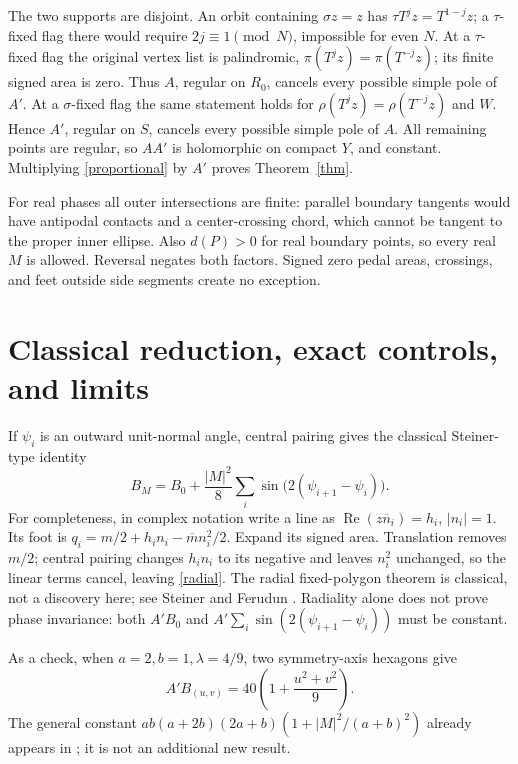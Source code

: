 \documentclass[11pt]{article}
\newcommand{\pp}{\pi}
\begin{document}
The two supports are disjoint. An orbit containing \(\sigma z=z\)
has \(\tau T^jz=T^{1-j}z\); a \(\tau\)-fixed flag there would require
\(2j\equiv1\pmod N\), impossible for even \(N\).
At a \(\tau\)-fixed flag the original vertex list is palindromic,
\(\pp(T^jz)=\pp(T^{-j}z)\); its finite signed area is zero.
Thus \(A\), regular on \(R_0\), cancels every possible simple pole of \(A'\).
At a \(\sigma\)-fixed flag the same statement holds for
\(\rho(T^jz)=\rho(T^{-j}z)\) and \(W\).
Hence \(A'\), regular on \(S\), cancels every possible simple pole of \(A\).
All remaining points are regular, so \(AA'\) is holomorphic on compact
\(Y\), and constant. Multiplying \eqref{proportional} by \(A'\)
proves Theorem~\ref{thm}.

For real phases all outer intersections are finite: parallel boundary
tangents would have antipodal contacts and a center-crossing chord,
which cannot be tangent to the proper inner ellipse.
Also \(d(P)>0\) for real boundary points, so every real \(M\) is allowed.
Reversal negates both factors. Signed zero pedal areas, crossings,
and feet outside side segments create no exception.

\section{Classical reduction, exact controls, and limits}
If \(\psi_i\) is an outward unit-normal angle, central pairing gives the
classical Steiner-type identity
\begin{equation}\label{radial}
 B_M=B_0+\frac{|M|^2}{8}\sum_i\sin\bigl(2(\psi_{i+1}-\psi_i)\bigr).
\end{equation}
For completeness, in complex notation write a line as
\(\operatorname{Re}(z\overline n_i)=h_i\), \(|n_i|=1\).
Its foot is \(q_i=m/2+h_in_i-\overline m n_i^2/2\).
Expand its signed area. Translation removes \(m/2\); central pairing
changes \(h_in_i\) to its negative and leaves \(n_i^2\) unchanged,
so the linear terms cancel, leaving \eqref{radial}.
The radial fixed-polygon theorem is classical, not a discovery here;
see Steiner \cite[Sections XV--XVI, printed pp.~19--21]{steiner}
and Ferudun \cite[Section 6]{ferudun10}.
Radiality alone does not prove phase invariance: both \(A'B_0\) and
\(A'\sum_i\sin(2(\psi_{i+1}-\psi_i))\) must be constant.

As a check, when \(a=2,b=1,\lambda=4/9\), two symmetry-axis hexagons give
\[
 A'B_{(u,v)}=40\left(1+\frac{u^2+v^2}{9}\right).
\]
The general constant \(ab(a+2b)(2a+b)(1+|M|^2/(a+b)^2)\) already appears
in \cite[Proposition 4]{ferudun10}; it is not an additional new result.
\end{document}
